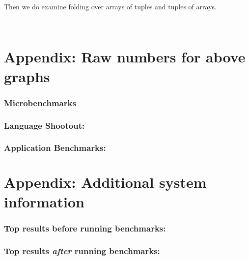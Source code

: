\documentclass{article}
\begin{document}
Then we do examine folding over arrays of tuples and tuples of arrays.
\begin{center}
\mbox{
}
\end{center}









\appendix
\section{Appendix: Raw numbers for above graphs}

\subsubsection*{Microbenchmarks}
{\footnotesize

}

\subsubsection*{Language Shootout:}
{\footnotesize
}

\subsubsection*{Application Benchmarks:}
{\footnotesize
}

\section{Appendix: Additional system information}

\subsubsection*{Top results before running benchmarks:}
{
\footnotesize

}
\subsubsection*{Top results {\em after} running benchmarks:}
{
\footnotesize

}
\end{document}
